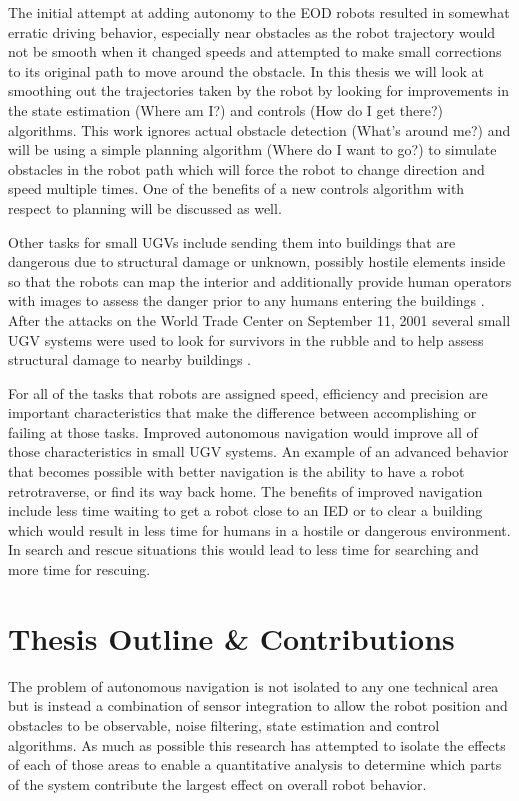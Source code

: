 The initial attempt at adding autonomy to the EOD robots resulted in somewhat erratic driving behavior, especially near obstacles as the robot trajectory would not be smooth when it changed speeds and attempted to make small corrections to its original path to move around the obstacle. In this thesis we will look at smoothing out the trajectories taken by the robot by looking for improvements in the state estimation (Where am I?) and controls (How do I get there?) algorithms. This work ignores actual obstacle detection (What's around me?) and will be using a simple planning algorithm (Where do I want to go?) to simulate obstacles in the robot path which will force the robot to change direction and speed multiple times. One of the benefits of a new controls algorithm with respect to planning will be discussed as well.

Other tasks for small UGVs include sending them into buildings that are dangerous due to structural damage or unknown, possibly hostile elements inside so that the robots can map the interior and additionally provide human operators with images to assess the danger prior to any humans entering the buildings \cite{CongressUGV06}. After the attacks on the World Trade Center on September 11, 2001 several small UGV systems were used to look for survivors in the rubble and to help assess structural damage to nearby buildings \cite{Everett02}.

For all of the tasks that robots are assigned speed, efficiency and precision are important characteristics that make the difference between accomplishing or failing at those tasks. Improved autonomous navigation would improve all of those characteristics in small UGV systems. An example of an advanced behavior that becomes possible with better navigation is the ability to have a robot retrotraverse, or find its way back home. The benefits of improved navigation include less time waiting to get a robot close to an IED or to clear a building which would result in less time for humans in a hostile or dangerous environment. In search and rescue situations this would lead to less time for searching and more time for rescuing.

\section{Thesis Outline \& Contributions}
\label{sec:outline}
The problem of autonomous navigation is not isolated to any one technical area but is instead a combination of sensor integration to allow the robot position and obstacles to be observable, noise filtering, state estimation and control algorithms. As much as possible this research has attempted to isolate the effects of each of those areas to enable a quantitative analysis to determine which parts of the system contribute the largest effect on overall robot behavior.

